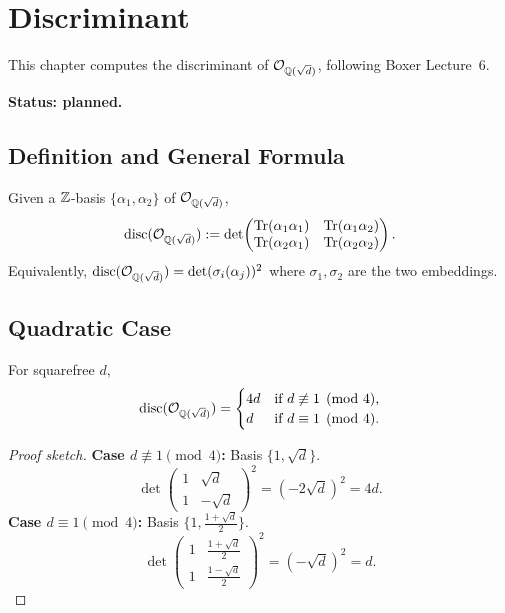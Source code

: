 \chapter{Discriminant}\label{ch:discriminant}

This chapter computes the discriminant of $\mathcal{O}_{\mathbb{Q}(\sqrt{d})}$,
following Boxer Lecture~6.

\textbf{Status: planned.}

\section{Definition and General Formula}

\begin{definition}
  \label{def:plan_disc}
  \notready
  Given a $\mathbb{Z}$-basis $\{\alpha_1,\alpha_2\}$ of $\mathcal{O}_{\mathbb{Q}(\sqrt{d})}$,
  \[
    \operatorname{disc}(\mathcal{O}_{\mathbb{Q}(\sqrt{d})}) :=
    \det\!\begin{pmatrix}
      \operatorname{Tr}(\alpha_1\alpha_1) & \operatorname{Tr}(\alpha_1\alpha_2)\\
      \operatorname{Tr}(\alpha_2\alpha_1) & \operatorname{Tr}(\alpha_2\alpha_2)
    \end{pmatrix}.
  \]
  Equivalently, $\operatorname{disc}(\mathcal{O}_{\mathbb{Q}(\sqrt{d})}) =
  \det(\sigma_i(\alpha_j))^2$ where $\sigma_1,\sigma_2$
  are the two embeddings.
\end{definition}

\section{Quadratic Case}

\begin{theorem}
  \label{thm:plan_disc_quadratic}
  \notready
  For squarefree $d$,
  \[
    \operatorname{disc}(\mathcal{O}_{\mathbb{Q}(\sqrt{d})}) =
    \begin{cases}
      4d  & \text{if } d\not\equiv 1\pmod{4},\\
      d   & \text{if } d\equiv 1\pmod{4}.
    \end{cases}
  \]
\end{theorem}

\begin{proof}[Proof sketch]
  \textbf{Case $d\not\equiv 1\pmod{4}$:}
  Basis $\{1,\sqrt{d}\}$.
  \[
    \det\!\begin{pmatrix}1&\sqrt{d}\\1&-\sqrt{d}\end{pmatrix}^2
    = (-2\sqrt{d})^2 = 4d.
  \]
  \textbf{Case $d\equiv 1\pmod{4}$:}
  Basis $\{1,\frac{1+\sqrt{d}}{2}\}$.
  \[
    \det\!\begin{pmatrix}1&\frac{1+\sqrt{d}}{2}\\
    1&\frac{1-\sqrt{d}}{2}\end{pmatrix}^2
    = (-\sqrt{d})^2 = d.
  \]
\end{proof}

